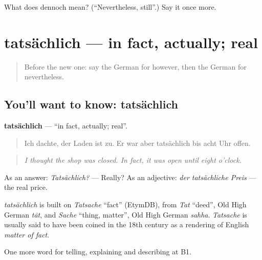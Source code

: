\begin{tcolorbox}[breakable,colback=teal!4,colframe=teal!35!black,title={Before you move on}]
What does dennoch mean? (\textquotedblleft{}Nevertheless, still\textquotedblright{}.) Say it once more.
\end{tcolorbox}
\section[tatsächlich]{tatsächlich — in fact, actually; real}

\label{lesson:GE-C341-tatsaechlich}



\begin{quote}
Before the new one: say the German for however, then the German for nevertheless.
\end{quote}

\subsection*{You'll want to know: tatsächlich}
\textbf{tatsächlich} — \textquotedblleft{}in fact, actually; real\textquotedblright{}.

\begin{quote}
Ich dachte, der Laden ist zu. Er war aber tatsächlich bis acht Uhr offen.
\end{quote}

\begin{quote}
\emph{I thought the shop was closed. In fact, it was open until eight o'clock.}
\end{quote}

As an answer: \emph{Tatsächlich?} — Really? As an adjective: \emph{der tatsächliche Preis} — the real price.

\begin{cousinweb}
\emph{tatsächlich} is built on \emph{Tatsache} \textquotedblleft{}fact\textquotedblright{} (EtymDB), from \emph{Tat} \textquotedblleft{}deed\textquotedblright{}, Old High German \emph{tāt}, and \emph{Sache} \textquotedblleft{}thing, matter\textquotedblright{}, Old High German \emph{sahha}. \emph{Tatsache} is usually said to have been coined in the 18th century as a rendering of English \emph{matter of fact}.
\end{cousinweb}

\begin{grammarlens}[title={What you've built}]
One more word for telling, explaining and describing at B1.
\end{grammarlens}

